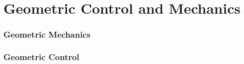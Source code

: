 \section{Geometric Control and Mechanics}

\begin{frame}
	\frametitle{Geometric Mechanics}
\end{frame}

\begin{frame}
	\frametitle{Geometric Control}
\end{frame}